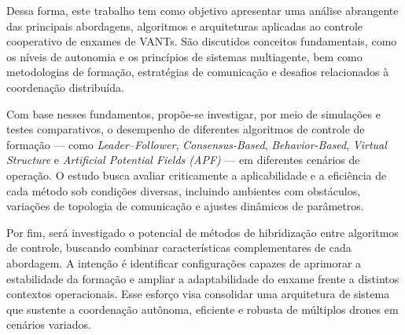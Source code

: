 Dessa forma, este trabalho tem como objetivo apresentar uma análise abrangente das principais abordagens, algoritmos e arquiteturas aplicadas ao controle cooperativo de enxames de VANTs. São discutidos conceitos fundamentais, como os níveis de autonomia e os princípios de sistemas multiagente, bem como metodologias de formação, estratégias de comunicação e desafios relacionados à coordenação distribuída. 

Com base nesses fundamentos, propõe-se investigar, por meio de simulações e testes comparativos, o desempenho de diferentes algoritmos de controle de formação — como \textit{Leader–Follower}, \textit{Consensus-Based}, \textit{Behavior-Based}, \textit{Virtual Structure} e \textit{Artificial Potential Fields (APF)} \citep{bu2024advancement} — em diferentes cenários de operação. O estudo busca avaliar criticamente a aplicabilidade e a eficiência de cada método sob condições diversas, incluindo ambientes com obstáculos, variações de topologia de comunicação e ajustes dinâmicos de parâmetros.

Por fim, será investigado o potencial de métodos de hibridização entre algoritmos de controle, buscando combinar características complementares de cada abordagem. A intenção é identificar configurações capazes de aprimorar a estabilidade da formação e ampliar a adaptabilidade do enxame frente a distintos contextos operacionais. Esse esforço visa consolidar uma arquitetura de sistema que sustente a coordenação autônoma, eficiente e robusta de múltiplos drones em cenários variados.


